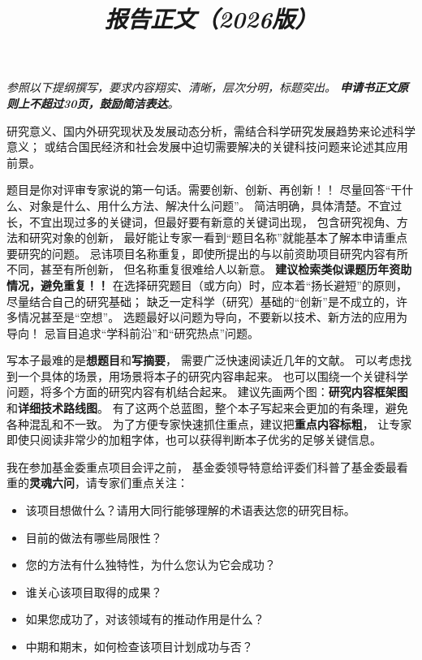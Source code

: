 \documentclass[12pt]{article}
\newcommand{\myEmph}[1]{\textbf{\textcolor[rgb]{0,0,0.25}{#1}}}
\begin{document}

\title{\emph{ 报告正文（2026版）}}
\maketitle
\thispagestyle{empty}
\emph{\large 参照以下提纲撰写，要求内容翔实、清晰，层次分明，标题突出。
\textcolor[RGB]{255, 0, 0}{
\textbf{申请书正文原则上不超过30页，鼓励简洁表达}。
}
}





研究意义、国内外研究现状及发展动态分析，需结合科学研究发展趋势来论述科学意义；
或结合国民经济和社会发展中迫切需要解决的关键科技问题来论述其应用前景。

题目是你对评审专家说的第一句话。需要创新、创新、再创新！！
尽量回答“干什么、对象是什么、用什么方法、解决什么问题”。
简洁明确，具体清楚。不宜过长，不宜出现过多的关键词，但最好要有新意的关键词出现，
包含研究视角、方法和研究对象的创新，
最好能让专家一看到“题目名称”就能基本了解本申请重点要研究的问题。 
忌讳项目名称重复，即使所提出的与以前资助项目研究内容有所不同，甚至有所创新，
但名称重复很难给人以新意。
\myEmph{建议检索类似课题历年资助情况，避免重复！！}
%
在选择研究题目（或方向）时，应本着“扬长避短”的原则，尽量结合自己的研究基础；
缺乏一定科学（研究）基础的“创新”是不成立的，许多情况甚至是“空想”。
选题最好以问题为导向，不要新以技术、新方法的应用为导向！
忌盲目追求“学科前沿”和“研究热点”问题。


写本子最难的是\myEmph{想题目}和\myEmph{写摘要}，
需要广泛快速阅读近几年的文献。
可以考虑找到一个具体的场景，用场景将本子的研究内容串起来。
也可以围绕一个关键科学问题，将多个方面的研究内容有机结合起来。
建议先画两个图：\myEmph{研究内容框架图}和\myEmph{详细技术路线图}。
有了这两个总蓝图，整个本子写起来会更加的有条理，避免各种混乱和不一致。
%
为了方便专家快速抓住重点，建议把\myEmph{重点内容标粗}，
让专家即使只阅读非常少的加粗字体，也可以获得判断本子优劣的足够关键信息。


我在参加基金委重点项目会评之前，
基金委领导特意给评委们科普了基金委最看重的\myEmph{灵魂六问}，请专家们重点关注：
\begin{itemize}
    \item 该项目想做什么？请用大同行能够理解的术语表达您的研究目标。
    \item 目前的做法有哪些局限性？
    \item 您的方法有什么独特性，为什么您认为它会成功？
    \item 谁关心该项目取得的成果？
    \item 如果您成功了，对该领域有的推动作用是什么？
    \item 中期和期末，如何检查该项目计划成功与否？
\end{itemize}
\end{document}
